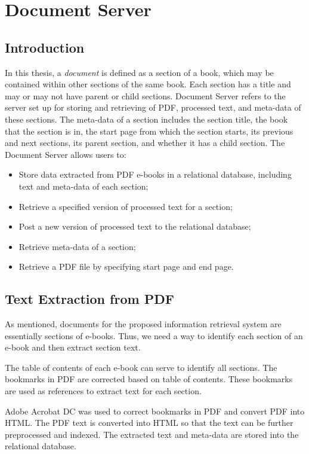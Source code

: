 \section{Document Server}
\subsection{Introduction}
In this thesis, a \textit{document} is defined as a section of a book, which may be contained within other sections of the same book. Each section has a title and may or may not have parent or child sections. Document Server refers to the server set up for storing and retrieving of PDF, processed text, and meta-data of these sections. The meta-data of a section includes the section title, the book that the section is in, the start page from which the section starts, its previous and next sections, its parent section, and whether it has a child section. The Document Server allows users to:
\begin{itemize}
\item Store data extracted from PDF e-books in a relational database, including text and meta-data of each section;
\item Retrieve a specified version of processed text for a section;
\item Post a new version of processed text to the relational database;
\item Retrieve meta-data of a section;
\item Retrieve a PDF file by specifying start page and end page.
\end{itemize}

\subsection{Text Extraction from PDF}
As mentioned, documents for the proposed information retrieval system are essentially sections of e-books. Thus, we need a way to identify each section of an e-book and then extract section text.

The table of contents of each e-book can serve to identify all sections. The bookmarks in PDF are corrected based on table of contents. These bookmarks are used as references to extract text for each section.

Adobe Acrobat DC was used to correct bookmarks in PDF and convert PDF into HTML. The PDF text is converted into HTML so that the text can be further preprocessed and indexed. The extracted text and meta-data are stored into the relational database.

